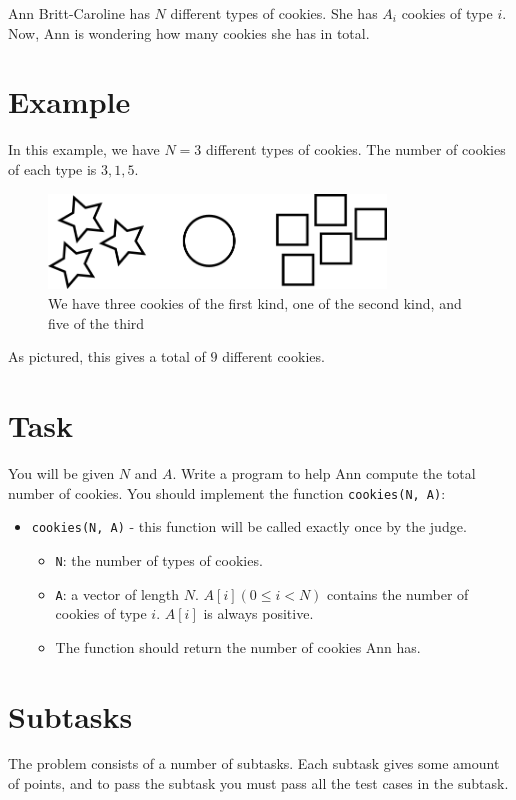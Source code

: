 \newcommand\version{v1}
Ann Britt-Caroline has $N$ different types of cookies. She has $A_i$ cookies of type $i$. Now, Ann is wondering how many cookies she has in total.

\section*{Example}
In this example, we have $N = 3$ different types of cookies. The number of cookies of each type is $3, 1, 5$.

\begin{figure}[h!]
  \centering
  \includegraphics[width=0.8\textwidth]{sample.png}
  \caption{We have three cookies of the first kind, one of the second kind, and five of the third}
\end{figure}

As pictured, this gives a total of $9$ different cookies.

\section*{Task}
You will be given $N$ and $A$. Write a program to help Ann compute the total number of cookies. You should implement the function \texttt{cookies(N, A)}:
\begin{itemize}
  \item \texttt{cookies(N, A)} - this function will be called exactly once by the judge.
  \begin{itemize}
    \item \texttt{N}: the number of types of cookies.
    \item \texttt{A}: a vector of length $N$. $A[i] (0 \le i < N)$ contains the number of cookies of type $i$. $A[i]$ is always positive.
    \item The function should return the number of cookies Ann has.
  \end{itemize}
\end{itemize}

\section*{Subtasks}
The problem consists of a number of subtasks. Each subtask gives some amount of points, and to pass
the subtask you must pass all the test cases in the subtask.

